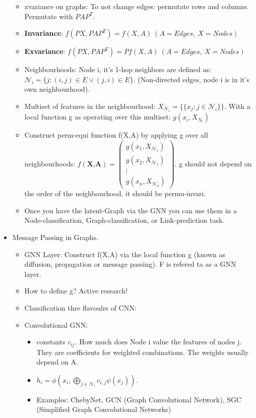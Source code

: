 \begin{itemize}[noitemsep,nolistsep]
\begin{itemize}[noitemsep,nolistsep]
		\item xvariance on graphs: To not change edges: permutate rows and columns. Permutate with $PAP^T$.
		\item \textbf{Invariance}: $f(PX,PAP^T) = f(X,A)\ (A = Edges,\ X = Nodes)$
		\item \textbf{Exvariance}: $f(PX,PAP^T) = Pf(X,A)\ (A = Edges,\ X = Nodes)$
		\item Neighbourhoods: Node i, it's 1-hop neighbors are defined as: $\mathcal{N}_i = \{j: (i,j) \in E \vee (j,i) \in E\}$. (Non-directed edges, node i is in it's own neighbourhood).
		\item Multiset of features in the neighbourhood: $X_{\mathcal{N}_i} = \{\{ x_j : j \in \mathcal{N}_i \}\}$. With a local function g as operating over this multiset: $g(x_i, X_{N_i})$
		\item Construct perm-equi function f(X,A) by applying g over all neighbourhoods: $f(\textbf{X,A}) = \begin{pmatrix} g(x_1,X_{\mathcal{N}_1}) \\ g(x_2,X_{\mathcal{N}_1}) \\ \vdots \\ g(x_n,X_{\mathcal{N}_n}) \end{pmatrix}$. g should not depend on the order of the neighbourhood, it should be permu-invari.
		\item Once you have the latent-Graph via the GNN you can use them in a Node-classification,  Graph-classification, or Link-prediction task.
	\end{itemize}
	\item Message Passing in Graphs.
	\begin{itemize}[noitemsep,nolistsep]
		\item GNN Layer: Construct f(X,A) via the local function g (known as diffusion, propagation or message passing). F is refered ta as a GNN layer.
		\item How to define g? Active research!
		\item Classification thre flavoulrs of CNN:
		\item Convolutional GNN:
		\begin{itemize}[noitemsep,nolistsep]
			\item constants $c_{ij}$. How much does Node i value the features of nodes j. They are coefficients for weighted combinations. The weights usually depend on A.
			\item $h_i = \phi (x_i, \bigoplus_{j \in \mathcal{N}_i} c_{i,j}\psi(x_j))$. 
			\item Examples: ChebyNet, GCN (Graph Convolutional Network), SGC (Simplified Graph Convolutional Networks)

\end{itemize}
\end{itemize}
\end{itemize}
